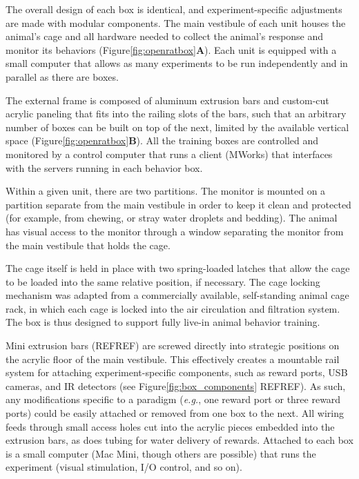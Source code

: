 The overall design of each box is identical, and experiment-specific adjustments are made with modular components. The main vestibule of each unit houses the animal's cage and all hardware needed to collect the animal's response and monitor its behaviors (Figure\ref{fig:openratbox}\textbf{A}). Each unit is equipped with a small computer that allows as many experiments to be run independently and in parallel as there are boxes. 

The external frame is composed of aluminum extrusion bars and custom-cut acrylic paneling that fits into the railing slots of the bars, such that an arbitrary number of boxes can be built on top of the next, limited by the available vertical space (Figure\ref{fig:openratbox}\textbf{B}). All the training boxes are controlled and monitored by a control computer that runs a client (MWorks) that interfaces with the servers running in each behavior box. 

Within a given unit, there are two partitions. The monitor is mounted on a partition separate from the main vestibule in order to keep it clean and protected (for example, from chewing, or stray water droplets and bedding). The animal has visual access to the monitor through a window separating the monitor from the main vestibule that holds the cage. 

The cage itself is held in place with two spring-loaded latches that allow the cage to be loaded into the same relative position, if necessary. The cage locking mechanism was adapted from a commercially available, self-standing animal cage rack, in which each cage is locked into the air circulation and filtration system. The box is thus designed to support fully live-in animal behavior training. 

Mini extrusion bars (REFREF) are screwed directly into strategic positions on the acrylic floor of the main vestibule. This effectively creates a mountable rail system for attaching experiment-specific components, such as reward ports, USB cameras, and IR detectors (see Figure\ref{fig:box_components} REFREF). As such, any modifications specific to a paradigm (\textit{e.g.}, one reward port or three reward ports) could be easily attached or removed from one box to the next. All wiring feeds through small access holes cut into the acrylic pieces embedded into the extrusion bars, as does tubing for water delivery of rewards. Attached to each box is a small computer (Mac Mini, though others are possible) that runs the experiment (visual stimulation, I/O control, and so on). 

